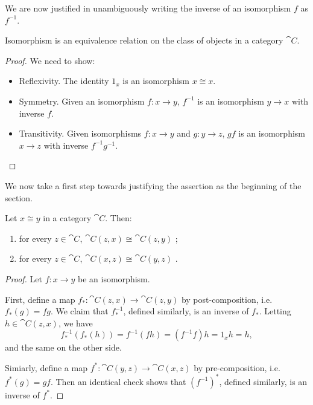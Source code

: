\begin{ntn}
  We are now justified in unambiguously writing the inverse of an isomorphism
  $f$ as $f^{-1}$.
\end{ntn}

\begin{prop}
  Isomorphism is an equivalence relation on the class of objects in a category $\cat{C}$.
\end{prop}

\begin{proof}
  We need to show:
  \begin{itemize}
    \item Reflexivity. The identity $1_x$ is an isomorphism $x\cong x$.
    \item Symmetry. Given an isomorphism $f: x\to y$, $f^{-1}$ is an isomorphism
      $y\to x$ with inverse $f$.
    \item Transitivity. Given isomorphisms $f: x\to y$ and $g: y\to z$,
      $gf$ is an isomorphism $x\to z$ with inverse $f^{-1}g^{-1}$. \qedhere
  \end{itemize}
\end{proof}

We now take a first step towards justifying the assertion as the beginning of
the section.

\begin{prop}\label{thm:iso-implies-hom-iso}
  Let $x\cong y$ in a category $\cat{C}$. Then:
  \begin{enumerate}
    \item for every $z\in\cat{C}$, $\cat{C}(z, x)\cong\cat{C}(z, y)$
      \label{item:iso-equiv-post};
    \item for every $z\in\cat{C}$, $\cat{C}(x, z)\cong\cat{C}(y, z)$
      \label{item:iso-equiv-pre}.
  \end{enumerate}
\end{prop}

\begin{proof}
  Let $f: x\to y$ be an isomorphism.

  First, define a map $f_*: \cat{C}(z, x)\to\cat{C}(z, y)$ by post-composition,
  i.e. $f_*(g) = fg$. We claim that $f^{-1}_*$, defined similarly, is an inverse
  of $f_*$. Letting $h\in\cat{C}(z, x)$, we have \[ f^{-1}_*(f_*(h)) =
  f^{-1}(fh) = (f^{-1}f)h = 1_xh = h, \]and the same on the other side.

  Simiarly, define a map $f^*: \cat{C}(y, z)\to\cat{C}(x, z)$ by
  pre-composition, i.e. $f^*(g) = gf$. Then an identical check shows that
  $(f^{-1})^*$, defined similarly, is an inverse of $f^*$.
\end{proof}

